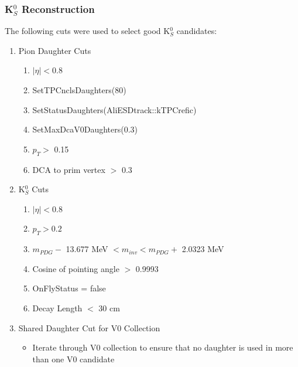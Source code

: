 \documentclass[../AnalysisNoteJBuxton.tex]{subfiles}
\begin{document}
\subsubsection{\texorpdfstring{K$^{0}_{S}$}{TEXT} Reconstruction}
\label{K0sReconstruction}

The following cuts were used to select good K$^{0}_{S}$ candidates:

\begin{enumerate}
 \item{Pion Daughter Cuts}
 \begin{enumerate}
  \item $|\eta| < 0.8$
  \item SetTPCnclsDaughters(80)
  \item SetStatusDaughters(AliESDtrack::kTPCrefic)
  \item SetMaxDcaV0Daughters(0.3)
  \item $p_{T} >$ 0.15
  \item DCA to prim vertex $>$ 0.3
 \end{enumerate}

 \item K$^{0}_{S}$ Cuts
 \begin{enumerate}
  \item $|\eta| < 0.8$
  \item $p_{T} > 0.2$
  \item $m_{PDG} -$ 13.677 MeV $< m_{inv} < m_{PDG} +$ 2.0323 MeV
  \item Cosine of pointing angle $>$ 0.9993
  \item OnFlyStatus = false
  \item Decay Length $<$ 30 cm
 \end{enumerate}  
 \item Shared Daughter Cut for V0 Collection
 \begin{itemize}
  \item Iterate through V0 collection to ensure that no daughter is used in more than one V0 candidate
 \end{itemize} 
\end{enumerate}
\end{document}
